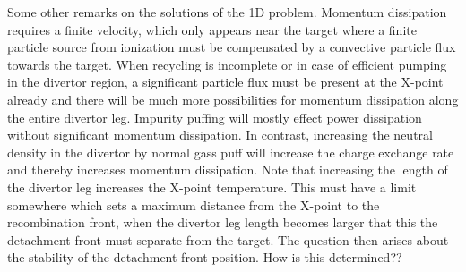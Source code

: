 \documentclass[amsmath,amssymb,a4]{revtex4-2}
\begin{document}
Some other remarks on the solutions of the 1D problem. Momentum dissipation requires a finite velocity, which only appears near the target where a finite particle source from ionization must be compensated by a convective particle flux towards the target. When recycling is incomplete or in case of efficient pumping in the divertor region, a significant particle flux must be present at the X-point already and there will be much more possibilities for momentum dissipation along the entire divertor leg. Impurity puffing will mostly effect power dissipation without significant momentum dissipation. In contrast, increasing the neutral density in the divertor by normal gass puff will increase the charge exchange rate and thereby increases momentum dissipation. Note that increasing the length of the divertor leg increases the X-point temperature. This must have a limit somewhere which sets a maximum distance from the X-point to the recombination front, when the divertor leg length becomes larger that this the detachment front must separate from the target. The question then arises about the stability of the detachment front position. How is this determined??
\end{document}
